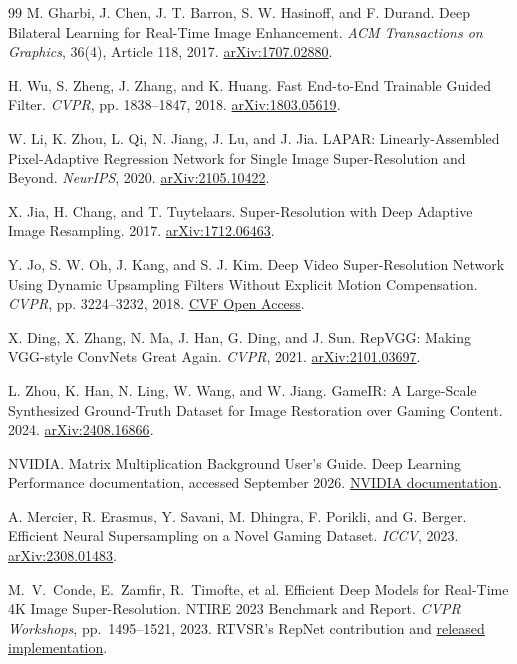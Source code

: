 \documentclass[10pt,twocolumn,letterpaper]{article}
\begin{document}
\begin{thebibliography}{99}
M. Gharbi, J. Chen, J. T. Barron, S. W. Hasinoff, and F. Durand.
Deep Bilateral Learning for Real-Time Image Enhancement.
\emph{ACM Transactions on Graphics}, 36(4), Article 118, 2017.
\href{https://arxiv.org/abs/1707.02880}{arXiv:1707.02880}.

H. Wu, S. Zheng, J. Zhang, and K. Huang.
Fast End-to-End Trainable Guided Filter.
\emph{CVPR}, pp. 1838--1847, 2018.
\href{https://arxiv.org/abs/1803.05619}{arXiv:1803.05619}.

W. Li, K. Zhou, L. Qi, N. Jiang, J. Lu, and J. Jia.
LAPAR: Linearly-Assembled Pixel-Adaptive Regression Network for Single Image Super-Resolution and Beyond.
\emph{NeurIPS}, 2020.
\href{https://arxiv.org/abs/2105.10422}{arXiv:2105.10422}.

X. Jia, H. Chang, and T. Tuytelaars.
Super-Resolution with Deep Adaptive Image Resampling.
2017.
\href{https://arxiv.org/abs/1712.06463}{arXiv:1712.06463}.

Y. Jo, S. W. Oh, J. Kang, and S. J. Kim.
Deep Video Super-Resolution Network Using Dynamic Upsampling Filters Without Explicit Motion Compensation.
\emph{CVPR}, pp. 3224--3232, 2018.
\href{https://openaccess.thecvf.com/content_cvpr_2018/html/Jo_Deep_Video_Super-Resolution_CVPR_2018_paper.html}{CVF Open Access}.

X. Ding, X. Zhang, N. Ma, J. Han, G. Ding, and J. Sun.
RepVGG: Making VGG-style ConvNets Great Again.
\emph{CVPR}, 2021.
\href{https://arxiv.org/abs/2101.03697}{arXiv:2101.03697}.

L. Zhou, K. Han, N. Ling, W. Wang, and W. Jiang.
GameIR: A Large-Scale Synthesized Ground-Truth Dataset for Image Restoration over Gaming Content.
2024.
\href{https://arxiv.org/abs/2408.16866}{arXiv:2408.16866}.

NVIDIA.
Matrix Multiplication Background User's Guide.
Deep Learning Performance documentation, accessed September 2026.
\href{https://docs.nvidia.com/deeplearning/performance/dl-performance-matrix-multiplication/index.html}{NVIDIA documentation}.

A. Mercier, R. Erasmus, Y. Savani, M. Dhingra, F. Porikli, and G. Berger.
Efficient Neural Supersampling on a Novel Gaming Dataset.
\emph{ICCV}, 2023.
\href{https://arxiv.org/abs/2308.01483}{arXiv:2308.01483}.

M.~V.~Conde, E.~Zamfir, R.~Timofte, et al.
Efficient Deep Models for Real-Time 4K Image Super-Resolution. NTIRE 2023 Benchmark and Report.
\emph{CVPR Workshops}, pp.~1495--1521, 2023.
RTVSR's RepNet contribution and \href{https://github.com/ezrealzhang/REPNet_NTIRE23-RTSR}{released implementation}.


\end{thebibliography}
\end{document}
